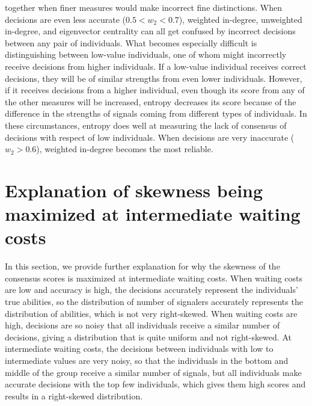 \documentclass{article}
\begin{document}
together when finer measures would make incorrect fine distinctions. When decisions are even less accurate ($0.5<w_2<0.7$), weighted in-degree, unweighted in-degree, and eigenvector centrality can all get confused by incorrect decisions between any pair of individuals. What becomes especially difficult is distinguishing between low-value individuals, one of whom might incorrectly receive decisions from higher individuals. If a low-value individual receives correct decisions, they will be of similar strengths from even lower individuals. However, if it receives decisions from a higher individual, even though its score from any of the other measures will be increased, entropy decreases its score because of the difference in the strengths of signals coming from different types of individuals. In these circumstances, entropy does well at measuring the lack of consensus of decisions with respect of low individuals. When decisions are very inaccurate ($w_2>0.6$), weighted in-degree becomes the most reliable.
 
 
\section{Explanation of skewness being maximized at intermediate waiting costs\label{skewness_dets}}
In this section, we provide further explanation for why the skewness of the consensus scores is maximized at intermediate waiting costs. When waiting costs are low and accuracy is high, the decisions accurately represent the individuals' true  abilities, so the distribution of number of signalers accurately represents the distribution of abilities, which is not very right-skewed.  When waiting costs are high, decisions are so noisy that all individuals receive a similar number of decisions, giving a distribution that is quite uniform and not right-skewed.  At intermediate waiting costs, the decisions between individuals with low to intermediate values are very noisy, so that the individuals in the bottom and middle of the group receive a similar number of signals, but all individuals make accurate decisions with the top few individuals, which gives them high scores and results in a right-skewed distribution.
\end{document}

